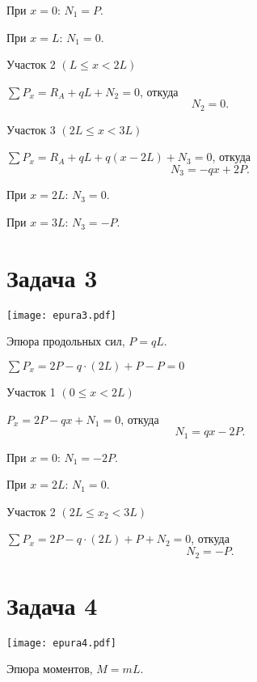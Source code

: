 При $x = 0$: $N_1 = P$.

При $x = L$: $N_1 = 0$.

\vspace{1.5ex}

Участок 2 $\left(L \le x < 2L\right)$

$\sum P_{x} = R_A + qL + N_2= 0$,
откуда
\[
    N_2 = 0.
\]

\vspace{1.5ex}

Участок 3 $\left(2L \le x < 3L\right)$

$\sum P_{x} = R_A + qL + q (x - 2L) + N_3 = 0$,
откуда
\[
    N_3 = -qx + 2P.
\]

При $x = 2L$: $N_3 = 0$.

При $x = 3L$: $N_3 = -P$.

\newpage


\section{Задача 3}

\begin{floatingfigure}[r]{0.5\textwidth}
    \centering
    \texttt{[image: epura3.pdf]}
    \caption{Эпюра продольных сил, $P = qL$.}
    \label{fig:chap1-epura3}
\end{floatingfigure}

$\sum P_x = 2P - q \cdot \left(2L\right) + P - P = 0$

\vspace{1.5ex}

Участок 1 $\left(0 \le x < 2L\right)$

$P_x = 2P - qx + N_1 = 0$,
откуда
\[
    N_1 = qx - 2P.
\]

При $x = 0$: $N_1 = -2 P$.

При $x = 2L$: $N_1 = 0$.

\vspace{1.5ex}

Участок 2 $\left(2L \le x_2 < 3L\right)$

$\sum P_x = 2P - q \cdot \left(2L\right) + P + N_2 = 0$,
откуда
\[
    N_2 = -P.
\]

\newpage


\section{Задача 4}

\begin{floatingfigure}[r]{0.5\textwidth}
    \centering
    \texttt{[image: epura4.pdf]}
    \caption{Эпюра моментов, $M = mL$.}
    \label{fig:chap1-epura4}
\end{floatingfigure}

